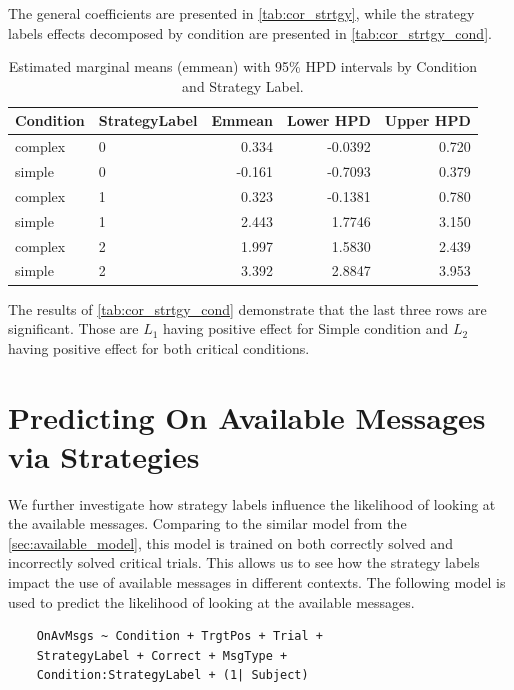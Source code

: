 The general coefficients are presented in \autoref{tab:cor_strtgy}, while the strategy labels effects decomposed by condition are presented in \autoref{tab:cor_strtgy_cond}.



\begin{table}[ht]
\centering
\begin{tabular}{llrrr}
\hline
\textbf{Condition} & \textbf{StrategyLabel} & \textbf{Emmean} & \textbf{Lower HPD} & \textbf{Upper HPD} \\
\hline
complex & 0 &  0.334 & -0.0392 &  0.720 \\
simple  & 0 & -0.161 & -0.7093 &  0.379 \\
complex & 1 &  0.323 & -0.1381 &  0.780 \\
simple  & 1 &  2.443 &  1.7746 &  3.150 \\
complex & 2 &  1.997 &  1.5830 &  2.439 \\
simple  & 2 &  3.392 &  2.8847 &  3.953 \\
\hline
\end{tabular}
\caption{Estimated marginal means (emmean) with 95\% HPD intervals by Condition and Strategy Label.}
\label{tab:cor_strtgy_cond}
\end{table}

The results of \autoref{tab:cor_strtgy_cond} demonstrate that the last three rows are significant. Those are $L_1$ having positive effect for Simple condition and $L_2$ having positive effect for both critical conditions.


\section{Predicting On Available Messages via Strategies}

We further investigate how strategy labels influence the likelihood of looking at the available messages. Comparing to the similar model from the \autoref{sec:available_model}, this model is trained on both correctly solved and incorrectly solved critical trials. This allows us to see how the strategy labels impact the use of available messages in different contexts. The following model is used to predict the likelihood of looking at the available messages.

\begin{verbatim}
    OnAvMsgs ~ Condition + TrgtPos + Trial +
    StrategyLabel + Correct + MsgType +
    Condition:StrategyLabel + (1| Subject)
\end{verbatim}



